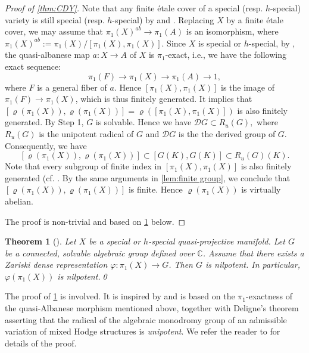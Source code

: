 \documentclass[english]{amsproc}
\theoremstyle{plain}
\newtheorem{thm}{Theorem}[section]
\theoremstyle{definition}
\theoremstyle{remark}
\theoremstyle{plain}
\numberwithin{equation}{thm} %
\newcommand{\cD}{\mathcal D}
\begin{document}
\begin{proof}[Proof of  \cref{thm:CDY}]
		   Note that any finite \'etale cover of a special (resp. $h$-special) variety is still special (resp. $h$-special) by \cite{Cam04} and \cite[Lemma 3.2]{CDY25b}.  Replacing  $X$ by a finite \'etale cover, we may assume that  $\pi_1(X)^{ab}\to \pi_1(A)$ is an isomorphism, where   $\pi_1(X)^{ab}:=\pi_1(X)/[\pi_1(X),\pi_1(X)]$.  Since  $X$ is special or $h$-special, by \cite[Proposition 4.13]{CDY25b}, the quasi-albanese map $a:X\to A$ of $X$ is $\pi_1$-exact, i.e.,   we have the following exact sequence:
		$$\pi_1(F)\to \pi_1(X)\to \pi_1(A)\to 1,$$ where $F$ is a general fiber of $a$. 
		Hence $[\pi_1(X),\pi_1(X)]$ is the image of $\pi_1(F)\to \pi_1(X)$, which is thus finitely generated.  
		It implies that  $[\varrho(\pi_1(X)),\varrho(\pi_1(X))]=\varrho([\pi_1(X),\pi_1(X)])$ is also finitely generated.
		By Step 1,  $G$ is solvable. Hence we have
		$
		\cD G\subset R_u(G),
		$ 
		where $R_u(G)$ is the unipotent radical of $G$ and $\cD G$ is the  the derived group of $G$. Consequently, 
		we have	%
		$$ [\varrho(\pi_1(X)),\varrho(\pi_1(X))]
		\subset [G(K),G(K)]\subset R_u(G)(K).$$  
		Note that every subgroup of finite index in $[\pi_1(X),\pi_1(X)]$ is also finitely generated (cf. \cite[Proposition 4.17]{ST00}. 
		By the same arguments in \cref{lem:finite group}, we conclude that $[\varrho(\pi_1(X)),\varrho(\pi_1(X))]$ is finite. 
		Hence $\varrho(\pi_1(X))$ is virtually abelian.  
		
		\medspace
		
		The proof is non-trivial and based on \ref{thm:202210123} below.
	\end{proof}  
	\begin{thm}[{\cite[Theorem 11.3]{CDY22}}] \label{thm:202210123}
		Let $X$ be a special or $h$-special quasi-projective manifold.
		Let $G$ be a connected, solvable algebraic group defined over $\mathbb C$.
		Assume that there exists a Zariski dense representation $\varphi:\pi_1(X)\to G$.
		Then $G$ is nilpotent.
		In particular, $\varphi(\pi_1(X))$ is nilpotent.\qed
	\end{thm} 
The proof of \cref{thm:202210123} is involved.
It is inspired by \cite{Cam01} and is based on the $\pi_1$-exactness of the
quasi-Albanese morphism mentioned above, together with Deligne’s theorem
asserting that the radical of the algebraic monodromy group of an admissible
variation of mixed Hodge structures is \emph{unipotent}.
We refer the reader to \cite[\S~4]{CDY25b} for details of the proof.
\end{document}
